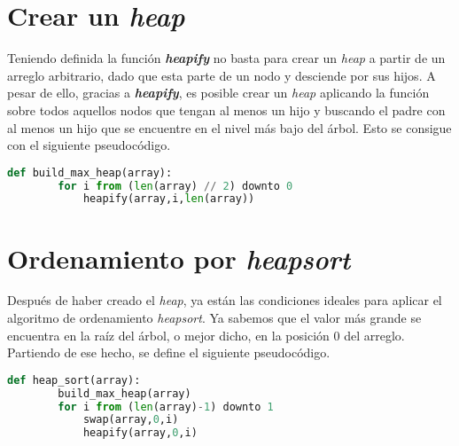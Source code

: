 \documentclass[11pt,letterpaper]{article}
\begin{document}
\newpage

\section*{Crear un \textit{heap}}

Teniendo definida la función \textbf{\textit{heapify}} no basta para crear un \textit{heap} a partir de un arreglo arbitrario, dado que esta parte de un nodo y desciende por sus hijos. A pesar de ello, gracias a \textbf{\textit{heapify}}, es posible crear un \textit{heap} aplicando la función sobre todos aquellos nodos que tengan al menos un hijo y buscando el padre con al menos un hijo que se encuentre en el nivel más bajo del árbol. Esto se consigue con el siguiente pseudocódigo.

\vspace{1em}

\begin{center}
\begin{lstlisting}[language=Python,frame=single,mathescape]
    def build_max_heap(array):
        for i from (len(array) // 2) downto 0
            heapify(array,i,len(array))
\end{lstlisting}
\end{center}


\section*{Ordenamiento por \textit{heapsort}}

Después de haber creado el \textit{heap}, ya están las condiciones ideales para aplicar el algoritmo de ordenamiento \textit{heapsort}. Ya sabemos que el valor más grande se encuentra en la raíz del árbol, o mejor dicho, en la posición 0 del arreglo. Partiendo de ese hecho, se define el siguiente pseudocódigo.

\vspace{1em}

\begin{center}
\begin{lstlisting}[language=Python,frame=single,mathescape]
    def heap_sort(array):
        build_max_heap(array)
        for i from (len(array)-1) downto 1
            swap(array,0,i)
            heapify(array,0,i)
\end{lstlisting}
\end{center}

\end{document}
